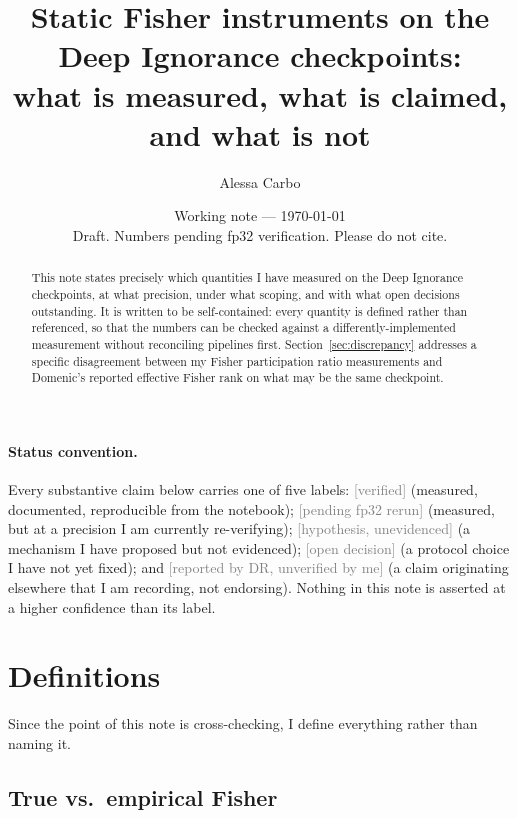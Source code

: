 \documentclass[11pt]{article}
\title{Static Fisher instruments on the Deep Ignorance checkpoints:\\
what is measured, what is claimed, and what is not}
\author{Alessa Carbo}
\date{Working note --- \today \\[2pt] \textsf{Draft. Numbers pending fp32 verification. Please do not cite.}}
\newcommand{\status}[1]{\textcolor{gray}{\footnotesize\textsf{[#1]}}}
\newcommand{\verified}{\status{verified}}
\newcommand{\pending}{\status{pending fp32 rerun}}
\newcommand{\hypothesis}{\status{hypothesis, unevidenced}}
\newcommand{\open}{\status{open decision}}
\newcommand{\external}{\status{reported by DR, unverified by me}}
\begin{document}
\maketitle

\begin{abstract}
\noindent This note states precisely which quantities I have measured on the
Deep Ignorance checkpoints, at what precision, under what scoping, and with
what open decisions outstanding. It is written to be self-contained: every
quantity is defined rather than referenced, so that the numbers can be checked
against a differently-implemented measurement without reconciling pipelines
first. Section~\ref{sec:discrepancy} addresses a specific disagreement between
my Fisher participation ratio measurements and Domenic's reported effective
Fisher rank on what may be the same checkpoint.
\end{abstract}

\paragraph{Status convention.} Every substantive claim below carries one of
five labels: \verified{} (measured, documented, reproducible from the notebook);
\pending{} (measured, but at a precision I am currently re-verifying);
\hypothesis{} (a mechanism I have proposed but not evidenced);
\open{} (a protocol choice I have not yet fixed); and \external{} (a claim
originating elsewhere that I am recording, not endorsing). Nothing in this note
is asserted at a higher confidence than its label.

\section{Definitions}

Since the point of this note is cross-checking, I define everything rather than
naming it.

\subsection{True vs.\ empirical Fisher}
\end{document}
